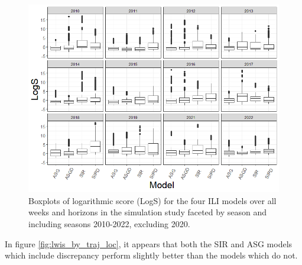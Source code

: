 \documentclass[ba]{imsart}
\theoremstyle{plain}
\theoremstyle{definition}
\theoremstyle{remark}
\begin{document}
\begin{supplement}
\begin{figure}[hbt!]
    \centering
    \includegraphics[scale=.5]{Images/logs_by_season.png}
    \caption{Boxplots of logarithmic score (LogS) for the four ILI models over all weeks and horizons in the simulation study faceted by season and including seasons 2010-2022, excluding 2020.}
    \label{fig:logs_by_season}
\end{figure}




In figure \ref{fig:lwis_by_traj_loc}, it appears that both the SIR and ASG models which include discrepancy perform slightly better than the models which do not.

\begin{figure}[hbt!]
    

\end{figure}
\end{supplement}
\end{document}
